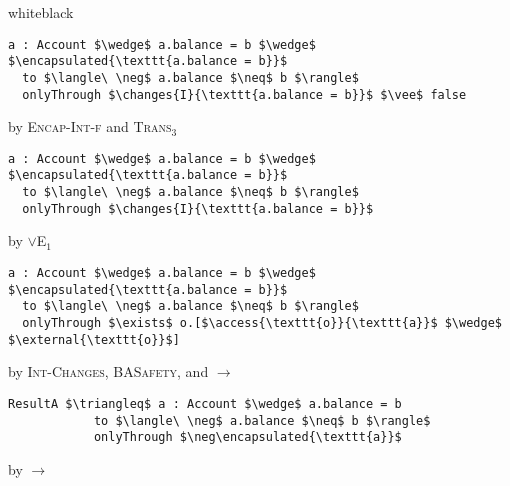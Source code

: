 \begin{minipage}{\linewidth}
\begin{proofBox}{white}{black}
\begin{minipage}{0.24\textwidth}
\end{minipage}
\begin{minipage}{0.75\textwidth}
\begin{lstlisting}[language = Chainmail, mathescape=true]
a : Account $\wedge$ a.balance = b $\wedge$ $\encapsulated{\texttt{a.balance = b}}$ 
  to $\langle\ \neg$ a.balance $\neq$ b $\rangle$ 
  onlyThrough $\changes{I}{\texttt{a.balance = b}}$ $\vee$ false
\end{lstlisting}
\end{minipage}
\begin{minipage}{0.24\textwidth}
\scriptsize
\hfill by \textsc{Encap-Int-f} and \textsc{Trans}$_3$
\end{minipage}
\begin{minipage}{0.75\textwidth}
\scriptsize
\begin{lstlisting}[language = Chainmail, mathescape=true]
a : Account $\wedge$ a.balance = b $\wedge$ $\encapsulated{\texttt{a.balance = b}}$ 
  to $\langle\ \neg$ a.balance $\neq$ b $\rangle$ 
  onlyThrough $\changes{I}{\texttt{a.balance = b}}$
\end{lstlisting}
\end{minipage}
\begin{minipage}{0.24\textwidth}
\scriptsize
\hfill by $\vee$\textsc{E}$_1$
\end{minipage}
\begin{minipage}{0.75\textwidth}
\begin{lstlisting}[language = Chainmail, mathescape=true]
a : Account $\wedge$ a.balance = b $\wedge$ $\encapsulated{\texttt{a.balance = b}}$ 
  to $\langle\ \neg$ a.balance $\neq$ b $\rangle$ 
  onlyThrough $\exists$ o.[$\access{\texttt{o}}{\texttt{a}}$ $\wedge$ $\external{\texttt{o}}$]
\end{lstlisting}
\end{minipage}
\begin{minipage}{0.24\textwidth}
\scriptsize
\hfill by \textsc{Int-Changes}, \textsc{BASafety}, and $\longrightarrow$
\end{minipage}
\begin{minipage}{0.75\textwidth}
\begin{lstlisting}[language = Chainmail, mathescape=true, frame = none]
ResultA $\triangleq$ a : Account $\wedge$ a.balance = b  
            to $\langle\ \neg$ a.balance $\neq$ b $\rangle$ 
            onlyThrough $\neg\encapsulated{\texttt{a}}$
\end{lstlisting}
\end{minipage}
\begin{minipage}{0.24\textwidth}
\scriptsize
\hfill by $\longrightarrow$
\end{minipage}
\end{proofBox}


\end{minipage}
